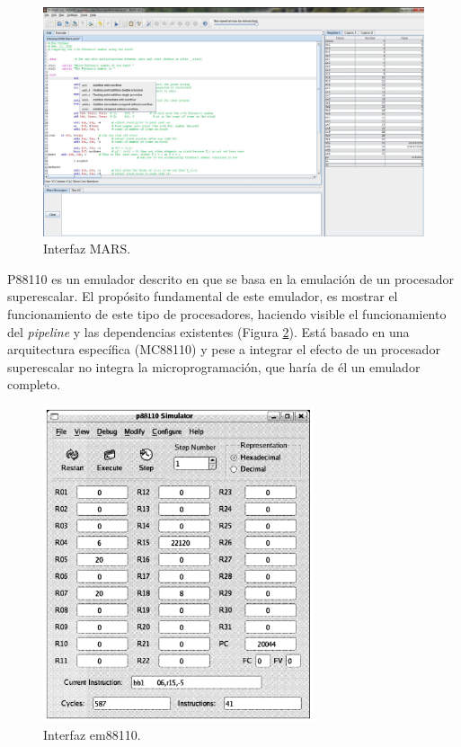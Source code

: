 \begin{figure}[htbp]
 	\centering
 	\includegraphics[width=14cm]{figures/mars_figure}
 	\caption{Interfaz MARS.}
	\label{fig:mars_figure}
\end{figure}

P88110 es un emulador descrito en \cite{garcia2009p88110} que se basa en la emulación de un procesador superescalar. El propósito fundamental de este emulador, es mostrar el funcionamiento de este tipo de procesadores, haciendo visible el funcionamiento del \emph{pipeline} y las dependencias existentes (Figura \ref{fig:p88110_figure}). Está basado en una arquitectura específica (MC88110) y pese a integrar el efecto de un procesador superescalar no integra la microprogramación, que haría de él un emulador completo.

\begin{figure}[htbp]
 	\centering
 	\includegraphics[width=8cm]{figures/em88110}
 	\caption{Interfaz em88110.}
	\label{fig:p88110_figure}
\end{figure}


